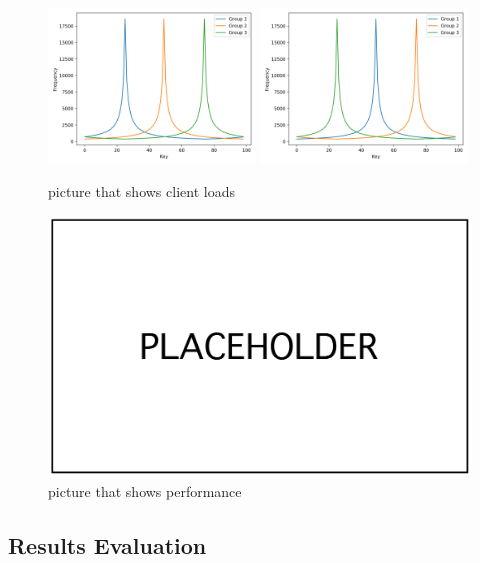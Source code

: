 \begin{figure}[!htb]
  \centering
  \includegraphics[width=0.49\textwidth,height=\textheight,keepaspectratio]{img/clients_loads.png}
  \includegraphics[width=0.49\textwidth,height=\textheight,keepaspectratio]{img/clients_loads_variable.png}
  \caption[caption]{ picture that shows client loads }
  \label{fig:variable-loads}
\end{figure}

\begin{figure}[!htb]
  \centering
  \includegraphics[width=\textwidth,height=\textheight,keepaspectratio]{img/placeholder.png}
  \caption[caption]{ picture that shows performance }
  \label{fig:variable-performance}
\end{figure}

\subsection{Results Evaluation}\label{sec:results-evaluation}